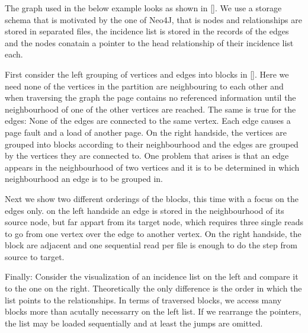   The graph used in the below example looks as shown in \ref{}.
  We use a storage schema that is motivated by the one of Neo4J, that is nodes and relationships are stored in separated files, the incidence list is stored in the records of the edges and the nodes conatain a pointer to the head relationship of their incidence list each.
  
  
  First consider the left grouping of vertices and edges into blocks in \ref{}. Here we need none of the vertices in the partition are neighbouring to each other and when traversing the graph the page contains no referenced information until the neighbourhood of one of the other vertices are reached.
  The same is true for the edges: None of the edges are connected to the same vertex. Each edge causes a page fault and a load of another page.
  On the right handside, the vertices are grouped into blocks according to their neighbourhood and the edges are grouped by the vertices they are connected to. One problem that arises is that an edge appears in the neighbourhood of two vertices and it is to be determined in which neighbourhood an edge is to be grouped in.
  
  
  Next we show two different orderings of the blocks, this time with a focus on the edges only. on the left handside an edge is stored in the neighbourhood of its source node, but far appart from its target node, which requires three single reads to go from one vertex over the edge to another vertex. On the right handside, the block are adjacent and one sequential read per file is enough to do the step from source to target.
  
  
  Finally: Consider the visualization of an incidence list on the left and compare it to the one on the right. Theoretically the only difference is the order in which the list points to the relationships. In terms of traversed blocks, we access many blocks more than acutally necessarry on the left list. If we rearrange the pointers, the list may be loaded sequentially and at least the jumps are omitted.

